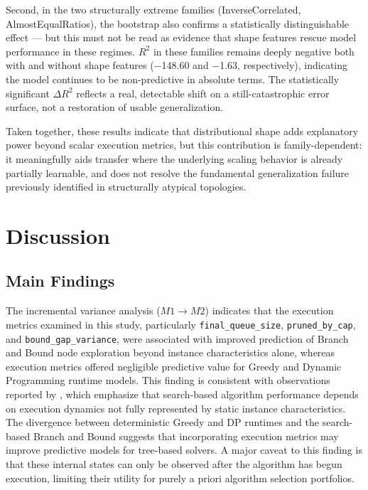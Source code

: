 \documentclass[11pt,a4paper]{article}
\begin{document}
Second, in the two structurally extreme families (InverseCorrelated, AlmostEqualRatios), the bootstrap also confirms a statistically distinguishable effect --- but this must not be read as evidence that shape features rescue model performance in these regimes. $R^2$ in these families remains deeply negative both with and without shape features (−148.60 and −1.63, respectively), indicating the model continues to be non-predictive in absolute terms. The statistically significant $\Delta R^2$ reflects a real, detectable shift on a still-catastrophic error surface, not a restoration of usable generalization.

Taken together, these results indicate that distributional shape adds explanatory power beyond scalar execution metrics, but this contribution is family-dependent: it meaningfully aids transfer where the underlying scaling behavior is already partially learnable, and does not resolve the fundamental generalization failure previously identified in structurally atypical topologies.

\section{Discussion}

\subsection{Main Findings}
The incremental variance analysis ($M1 \rightarrow M2$) indicates that the execution metrics examined in this study, particularly \texttt{final\_queue\_size}, \texttt{pruned\_by\_cap}, and \texttt{bound\_gap\_variance}, were associated with improved prediction of Branch and Bound node exploration beyond instance characteristics alone, whereas execution metrics offered negligible predictive value for Greedy and Dynamic Programming runtime models. This finding is consistent with observations reported by \citet{LeytonBrown2014}, which emphasize that search-based algorithm performance depends on execution dynamics not fully represented by static instance characteristics. The divergence between deterministic Greedy and DP runtimes and the search-based Branch and Bound suggests that incorporating execution metrics may improve predictive models for tree-based solvers. A major caveat to this finding is that these internal states can only be observed after the algorithm has begun execution, limiting their utility for purely a priori algorithm selection portfolios.
\end{document}
